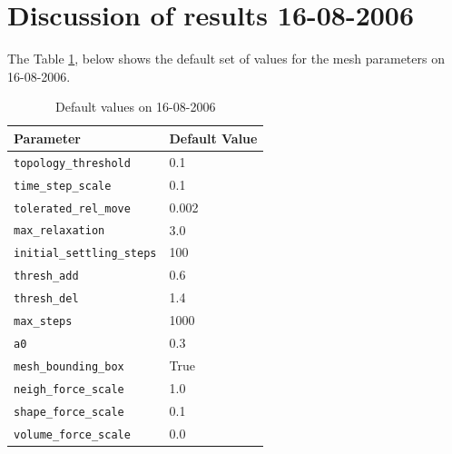 \documentclass[10pt,a4paper]{book}
\begin{document}
\section{Discussion of results 16-08-2006}
\label{sec:results16082006}

The Table \ref{table:defaultvalues16082006}, below shows the default set of values for the mesh parameters on 16-08-2006.

\begin{table}[tbhp]
\caption{Default values on 16-08-2006}
\centering
\begin{tabular}{ll}
\hline
\hline
Parameter & Default Value \\
\hline
\texttt{topology\_threshold} & 0.1\\
\texttt{time\_step\_scale} & 0.1\\
\texttt{tolerated\_rel\_move} & 0.002\\
\texttt{max\_relaxation} & 3.0\\
\texttt{initial\_settling\_steps} & 100\\
\texttt{thresh\_add} & 0.6\\
\texttt{thresh\_del} & 1.4\\
\texttt{max\_steps} & 1000\\
\texttt{a0} & 0.3\\
\texttt{mesh\_bounding\_box} & True\\
\texttt{neigh\_force\_scale} & 1.0\\
\texttt{shape\_force\_scale} & 0.1\\
\texttt{volume\_force\_scale} & 0.0\\
\hline
\end{tabular}
\label{table:defaultvalues16082006}
\end{table}
\end{document}
